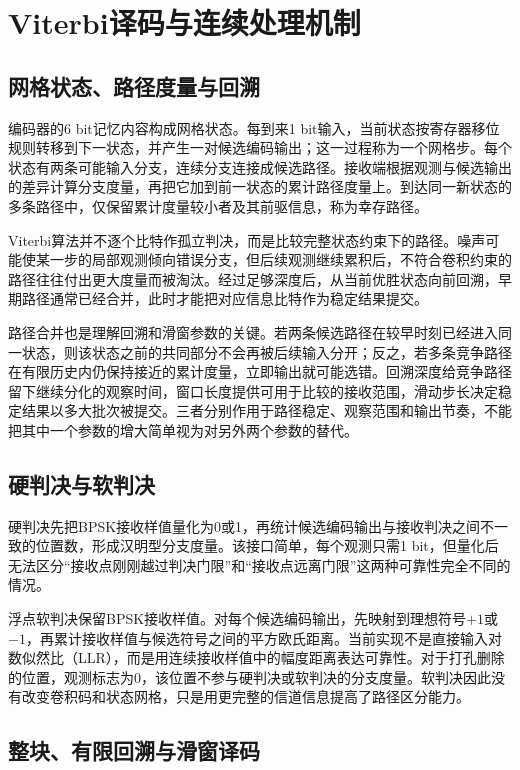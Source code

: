 \section{Viterbi译码与连续处理机制}

\subsection{网格状态、路径度量与回溯}

编码器的6 bit记忆内容构成网格状态。每到来1 bit输入，当前状态按寄存器移位规则转移到下一状态，并产生一对候选编码输出；这一过程称为一个网格步。每个状态有两条可能输入分支，连续分支连接成候选路径。接收端根据观测与候选输出的差异计算分支度量，再把它加到前一状态的累计路径度量上。到达同一新状态的多条路径中，仅保留累计度量较小者及其前驱信息，称为幸存路径。

Viterbi算法并不逐个比特作孤立判决，而是比较完整状态约束下的路径。噪声可能使某一步的局部观测倾向错误分支，但后续观测继续累积后，不符合卷积约束的路径往往付出更大度量而被淘汰。经过足够深度后，从当前优胜状态向前回溯，早期路径通常已经合并，此时才能把对应信息比特作为稳定结果提交。

路径合并也是理解回溯和滑窗参数的关键。若两条候选路径在较早时刻已经进入同一状态，则该状态之前的共同部分不会再被后续输入分开；反之，若多条竞争路径在有限历史内仍保持接近的累计度量，立即输出就可能选错。回溯深度给竞争路径留下继续分化的观察时间，窗口长度提供可用于比较的接收范围，滑动步长决定稳定结果以多大批次被提交。三者分别作用于路径稳定、观察范围和输出节奏，不能把其中一个参数的增大简单视为对另外两个参数的替代。

\subsection{硬判决与软判决}

硬判决先把BPSK接收样值量化为0或1，再统计候选编码输出与接收判决之间不一致的位置数，形成汉明型分支度量。该接口简单，每个观测只需1 bit，但量化后无法区分“接收点刚刚越过判决门限”和“接收点远离门限”这两种可靠性完全不同的情况。

浮点软判决保留BPSK接收样值。对每个候选编码输出，先映射到理想符号$+1$或$-1$，再累计接收样值与候选符号之间的平方欧氏距离。当前实现不是直接输入对数似然比（LLR），而是用连续接收样值中的幅度距离表达可靠性。对于打孔删除的位置，观测标志为0，该位置不参与硬判决或软判决的分支度量。软判决因此没有改变卷积码和状态网格，只是用更完整的信道信息提高了路径区分能力。

\subsection{整块、有限回溯与滑窗译码}

